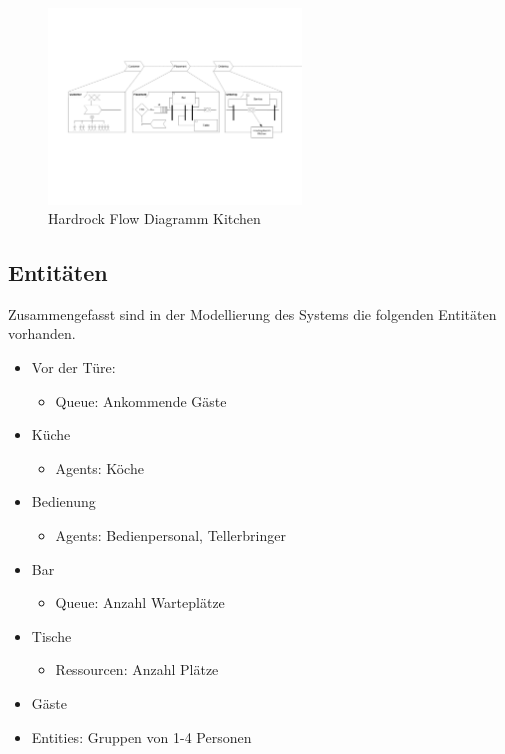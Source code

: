 \documentclass[ngerman,a4paper,12pt]{scrreprt}
\begin{document}
\begin{landscape}
		\begin{figure}[H]
			\begin{center}
					\includegraphics[page=3,trim=2cm 12cm 12cm 2cm, clip=true,width=0.6\textwidth]{../model/Modell_v2.pdf}
					\caption[Hardrock Flow Diagramm Kitchen]{Hardrock Flow Diagramm Kitchen}
					\label{flowDiagrammKitchen}
			\end{center}
		\end{figure}
		
		
\end{landscape}

		\subsection{Entitäten}
		Zusammengefasst sind in der Modellierung des Systems die folgenden Entitäten vorhanden.
		
			\begin{itemize}
		\item Vor der Türe:
			\begin{itemize}
				\item Queue: Ankommende Gäste
			\end{itemize}
		\item Küche
			\begin{itemize}
				\item Agents: Köche
			\end{itemize}
		\item Bedienung
			\begin{itemize}
				\item Agents: Bedienpersonal, Tellerbringer
			\end{itemize}
		\item Bar
			\begin{itemize}
				\item Queue: Anzahl Warteplätze
			\end{itemize}
		\item Tische
			\begin{itemize}
				\item Ressourcen: Anzahl Plätze
			\end{itemize}
	\end{itemize}
	\begin{itemize}
		\item Gäste
		\item Entities: Gruppen von 1-4 Personen 
	\end{itemize}
\end{document}

